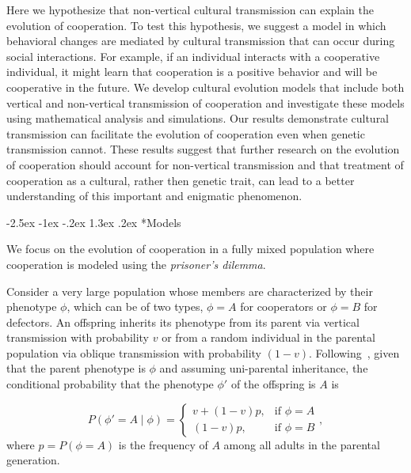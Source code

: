 \documentclass[12pt]{extarticle}
\makeatletter
\renewcommand\section{\@startsection {section}{1}{\z@}%
     {-2.5ex \@plus -1ex \@minus -.2ex}%
     {1.3ex \@plus.2ex}%
    {\Large\bfseries}}
\makeatother
\begin{document}
Here we hypothesize that non-vertical cultural transmission can explain the evolution of cooperation. 
To test this hypothesis, we suggest a model in which behavioral changes are mediated by cultural transmission that can occur during social interactions. For example, if an individual interacts with a cooperative individual, it might learn that cooperation is a positive behavior and will be cooperative in the future. 
We develop cultural evolution models that include both vertical and non-vertical transmission of cooperation and investigate these models using mathematical analysis and simulations.  
Our results demonstrate cultural transmission can facilitate the evolution of cooperation even when genetic transmission cannot.
These results suggest that further research on the evolution of cooperation should account for non-vertical transmission and that treatment of cooperation as a cultural, rather then genetic trait, can lead to a better understanding of this important and enigmatic phenomenon.


\section*{Models}

We focus on the evolution of cooperation in a fully mixed population where cooperation is modeled using the \emph{prisoner's dilemma}. %

Consider a very large population whose members are characterized by their phenotype $\phi$, which can be of two types, $\phi=A$ for cooperators or $\phi=B$ for defectors.
An offspring inherits its phenotype from its parent via vertical transmission with probability $v$ or from a random individual in the parental population via oblique transmission with probability $(1-v)$. 
Following~\citet{ram2018evolution}, given that the parent phenotype is $\phi$ and assuming uni-parental inheritance, %
the conditional probability that the phenotype $\phi'$ of the offspring is $A$ is 

\begin{equation} \label{eq:vertical_oblique_transmission}
P(\phi'=A \mid \phi) = \begin{cases}
v + (1-v)p, & \text{if } \phi=A \\
(1-v)p, & \text{if } \phi=B
\end{cases},
\end{equation}
where $p=P(\phi=A)$ is the frequency of $A$ among all adults in the parental generation.  
\end{document}
